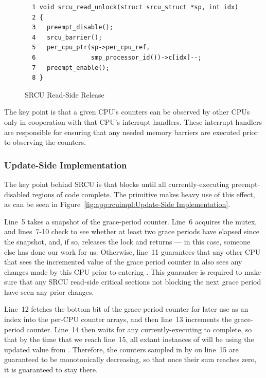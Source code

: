 \begin{figure}[htbp]
{ \scriptsize
\begin{verbatim}
  1 void srcu_read_unlock(struct srcu_struct *sp, int idx)
  2 {
  3   preempt_disable();
  4   srcu_barrier();
  5   per_cpu_ptr(sp->per_cpu_ref,
  6               smp_processor_id())->c[idx]--;
  7   preempt_enable();
  8 }
\end{verbatim}
}
\caption{SRCU Read-Side Release}
\label{fig:app:rcuimpl:Read-Side Release}
\end{figure}

The key point is that a given CPU's counters
can be observed by other CPUs only in
cooperation with that CPU's interrupt handlers.
These interrupt handlers are responsible for ensuring that any needed
memory barriers are executed prior to observing the counters.

\subsubsection{Update-Side Implementation}
\label{sec:app:rcuimpl:Update-Side Implementation}

The key point behind SRCU is that 
blocks until all currently-executing preempt-disabled regions of
code complete.
The  primitive makes heavy use of this effect,
as can be seen in
Figure~\ref{fig:app:rcuimpl:Update-Side Implementation}.

Line~5 takes a snapshot of the grace-period counter.
Line~6 acquires the mutex, and lines~7-10 check to see whether
at least two grace periods have elapsed since the snapshot,
and, if so, releases the lock and returns --- in this case, someone
else has done our work for us.
Otherwise, line~11 guarantees that any other CPU that sees the
incremented value of the grace period counter in 
also sees any changes made by this CPU prior to entering
.
This guarantee is required to make sure that any SRCU read-side
critical sections not blocking the next grace period have seen
any prior changes.

Line~12 fetches the bottom bit of the grace-period counter for later
use as an index into the per-CPU counter arrays, and then line~13
increments the grace-period counter.
Line~14 then waits for any currently-executing 
to complete, so that by the time that we reach line~15, all
extant instances of  will be using the updated
value from .
Therefore, the counters sampled in by 
on line~15 are guaranteed to
be monotonically decreasing, so that once their sum reaches zero, it
is guaranteed to stay there.

